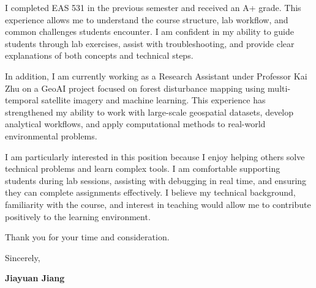 \documentclass[11pt, letterpaper]{article}
\begin{document}
I completed EAS 531 in the previous semester and received an A+ grade. This experience allows me to understand the course structure, lab workflow, and common challenges students encounter. I am confident in my ability to guide students through lab exercises, assist with troubleshooting, and provide clear explanations of both concepts and technical steps.

In addition, I am currently working as a Research Assistant under Professor Kai Zhu on a GeoAI project focused on forest disturbance mapping using multi-temporal satellite imagery and machine learning. This experience has strengthened my ability to work with large-scale geospatial datasets, develop analytical workflows, and apply computational methods to real-world environmental problems.

I am particularly interested in this position because I enjoy helping others solve technical problems and learn complex tools. I am comfortable supporting students during lab sessions, assisting with debugging in real time, and ensuring they can complete assignments effectively. I believe my technical background, familiarity with the course, and interest in teaching would allow me to contribute positively to the learning environment.

Thank you for your time and consideration.

\vspace{12pt}
\noindent Sincerely,

\vspace{24pt}
\noindent \textbf{Jiayuan Jiang}
\end{document}
